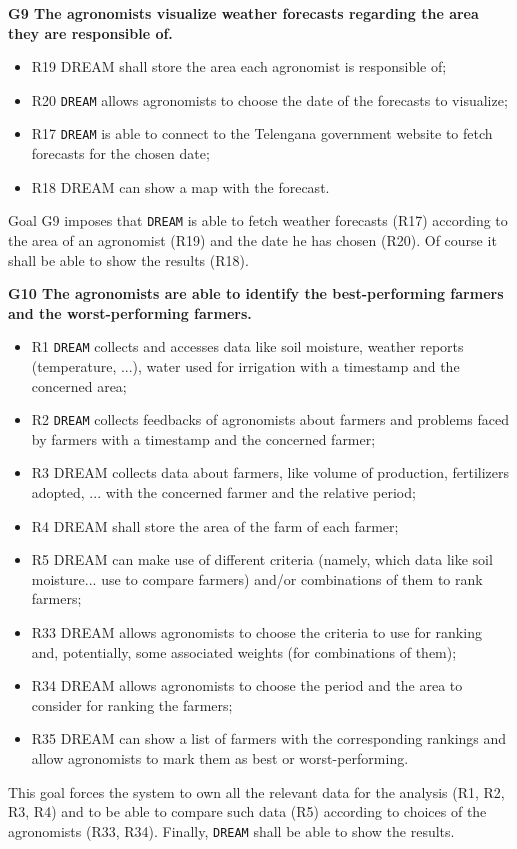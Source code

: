 \documentclass{article}
\begin{document}
\vspace{5mm}
\textbf{G9 The agronomists visualize weather forecasts regarding the area they are responsible of.}
\begin{itemize}
    \item R19 DREAM shall store the area each agronomist is responsible of;

    \item R20 \verb|DREAM| allows agronomists to choose the date of the forecasts to visualize;

    \item R17 \verb|DREAM| is able to connect to the Telengana government website to fetch forecasts for the chosen date;

    \item R18 DREAM can show a map with the forecast.
\end{itemize}
Goal G9 imposes that \verb|DREAM| is able to fetch weather forecasts (R17) according to the area of an agronomist (R19) and the date he has chosen (R20). Of course it shall be able to show the results (R18).

\vspace{5mm}
\textbf{G10 The agronomists are able to identify the best-performing farmers and the worst-performing farmers.}
\begin{itemize}
    \item R1 \verb|DREAM| collects and accesses data like soil moisture, weather reports (temperature, ...), water used for irrigation with a timestamp and the concerned area;

    \item R2 \verb|DREAM| collects feedbacks of agronomists about farmers and problems faced by farmers with a timestamp and the concerned farmer;

    \item R3 DREAM collects data about farmers, like volume of production, fertilizers adopted, ... with the concerned farmer and the relative period;

    \item R4 DREAM shall store the area of the farm of each farmer;

    \item R5 DREAM can make use of different criteria (namely, which data like soil moisture... use to compare farmers) and/or combinations of them to rank farmers;

    \item R33 DREAM allows agronomists to choose the criteria to use for ranking and, potentially, some associated weights (for combinations of them);

    \item R34 DREAM allows agronomists to choose the period and the area to consider for ranking the farmers;

    \item R35 DREAM can show a list of farmers with the corresponding rankings and allow agronomists to mark them as best or worst-performing.
\end{itemize}
This goal forces the system to own all the relevant data for the analysis (R1, R2, R3, R4) and to be able to compare such data (R5) according to choices of the agronomists (R33, R34). Finally, \verb|DREAM| shall be able to show the results.
\end{document}
